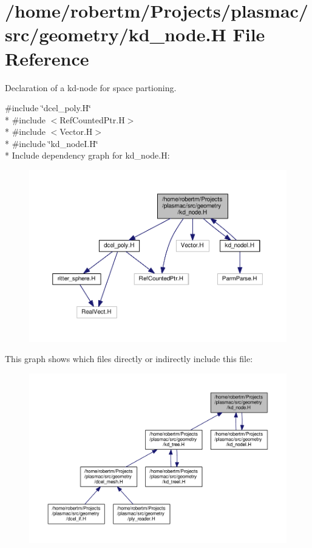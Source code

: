 \hypertarget{kd__node_8H}{}\section{/home/robertm/\+Projects/plasmac/src/geometry/kd\+\_\+node.H File Reference}
\label{kd__node_8H}


Declaration of a kd-\/node for space partioning.  


{\ttfamily \#include \char`\"{}dcel\+\_\+poly.\+H\char`\"{}}\\*
{\ttfamily \#include $<$Ref\+Counted\+Ptr.\+H$>$}\\*
{\ttfamily \#include $<$Vector.\+H$>$}\\*
{\ttfamily \#include \char`\"{}kd\+\_\+node\+I.\+H\char`\"{}}\\*
Include dependency graph for kd\+\_\+node.\+H\+:\nopagebreak
\begin{figure}[H]
\begin{center}
\leavevmode
\includegraphics[width=350pt]{kd__node_8H__incl}
\end{center}
\end{figure}
This graph shows which files directly or indirectly include this file\+:\nopagebreak
\begin{figure}[H]
\begin{center}
\leavevmode
\includegraphics[width=350pt]{kd__node_8H__dep__incl}
\end{center}
\end{figure}
